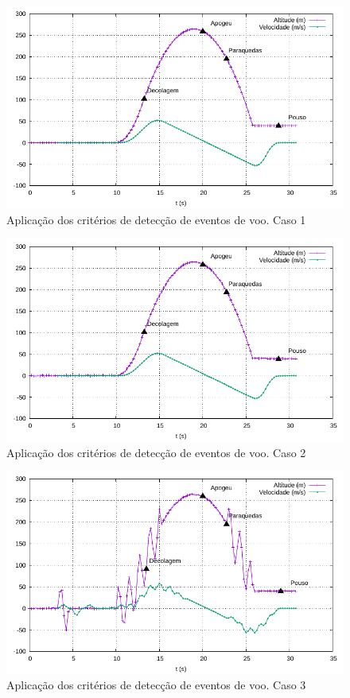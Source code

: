 \documentclass[12pt,a4paper]{article}
\begin{document}
\begin{figure}[!ht]
	\centering
	\includegraphics[width=\textwidth]{./data/cases/case01/trajectory}
	\caption{Aplicação dos critérios de detecção de eventos de voo. Caso 1}
	\label{fig:case01}
\end{figure}
\begin{figure}[!ht]
	\centering
	\includegraphics[width=\textwidth]{./data/cases/case02/trajectory}
	\caption{Aplicação dos critérios de detecção de eventos de voo. Caso 2}
	\label{fig:case02}
\end{figure}
\begin{figure}[!ht]
	\centering
	\includegraphics[width=\textwidth]{./data/cases/case03/trajectory}
	\caption{Aplicação dos critérios de detecção de eventos de voo. Caso 3}
	\label{fig:case03}
\end{figure}
\end{document}

